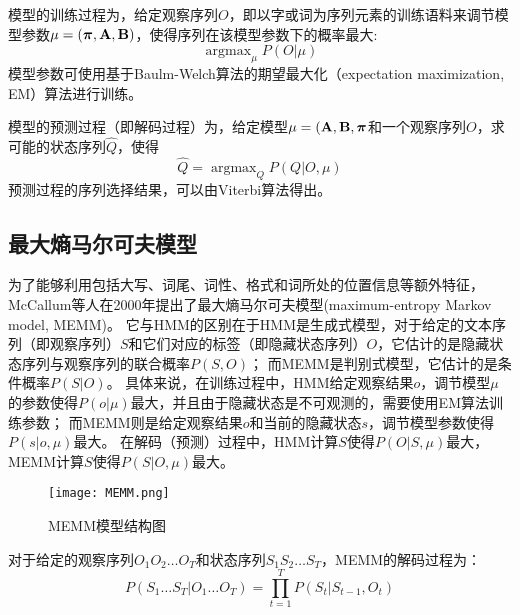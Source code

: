 模型的训练过程为，给定观察序列$O$，即以字或词为序列元素的训练语料来调节模型参数$\mu = (\boldsymbol{\mathbf{\pi}},\boldsymbol{\mathbf{A}},\boldsymbol{\mathbf{B}})$，使得序列在该模型参数下的概率最大:
\begin{equation}
    \mathop{\arg \max}_\mu P(O|\mu)
\end{equation}
模型参数可使用基于Baulm-Welch算法的期望最大化（expectation maximization, EM）算法进行训练。

模型的预测过程（即解码过程）为，给定模型$\mu = (\boldsymbol{\mathbf{A}},\boldsymbol{\mathbf{B}},\boldsymbol{\mathbf{\pi}}$和一个观察序列$O$，求可能的状态序列$\hat{Q}$，使得
\begin{equation}
    \hat{Q} = \mathop{\arg \max}_Q P(Q|O,\mu)
\end{equation}
预测过程的序列选择结果，可以由Viterbi算法得出。

\subsection{最大熵马尔可夫模型}
为了能够利用包括大写、词尾、词性、格式和词所处的位置信息等额外特征，McCallum等人在2000年提出了最大熵马尔可夫模型(maximum-entropy Markov model, MEMM)。
它与HMM的区别在于HMM是生成式模型，对于给定的文本序列（即观察序列）$S$和它们对应的标签（即隐藏状态序列）$O$，它估计的是隐藏状态序列与观察序列的联合概率$P(S,O)$；
而MEMM是判别式模型，它估计的是条件概率$P(S|O)$。
具体来说，在训练过程中，HMM给定观察结果$o$，调节模型$\mu$的参数使得$P(o|\mu)$最大，并且由于隐藏状态是不可观测的，需要使用EM算法训练参数；
而MEMM则是给定观察结果$o$和当前的隐藏状态$s$，调节模型参数使得$P(s|o,\mu)$最大。
在解码（预测）过程中，HMM计算$S$使得$P(O|S,\mu)$最大，MEMM计算$S$使得$P(S|O,\mu)$最大。

\begin{figure}[!htpb]
    \centering
    \texttt{[image: MEMM.png]}
    \caption{MEMM模型结构图}
    \label{fig:MEMM}
\end{figure}

对于给定的观察序列$O_1 O_2\dots O_T$和状态序列$S_1 S_2\dots S_T$，MEMM的解码过程为：
\begin{equation}
    P(S_1\dots S_T|O_1\dots O_T) = \prod_{t=1}^{T}P(S_t|S_{t-1}, O_t)
    \label{eq:memm-decoding}
\end{equation}


